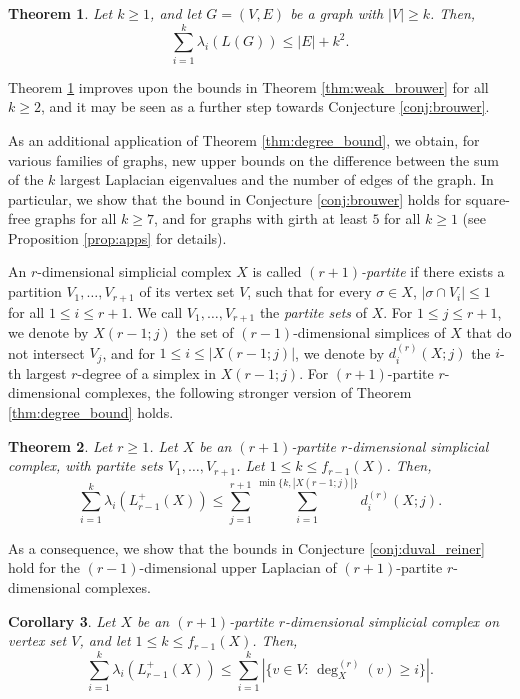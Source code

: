\documentclass[a4paper,11pt]{article}
\theoremstyle{plain}
\newtheorem{theorem}{\bf Theorem}
\newtheorem{corollary}[theorem]{\bf Corollary}
\theoremstyle{definition}
\numberwithin{theorem}{section}
\numberwithin{equation}{section}
\begin{document}
\begin{theorem}\label{thm:weak_brouwer_improved}
    Let $k\ge 1$, and let $G=(V,E)$ be a graph with $|V|\ge k$. Then,
    \[
        \sum_{i=1}^k \lambda_i(L(G))\le |E|+k^2.
    \]
\end{theorem}
Theorem \ref{thm:weak_brouwer_improved} improves upon the bounds in Theorem \ref{thm:weak_brouwer} for all $k\ge 2$, and it may be seen as a further step towards Conjecture \ref{conj:brouwer}.

As an additional application of Theorem \ref{thm:degree_bound}, we obtain, for various families of graphs, new upper bounds on the difference between the sum of the $k$ largest Laplacian eigenvalues and the number of edges of the graph. In particular, we show that the bound in Conjecture \ref{conj:brouwer} holds for square-free graphs for all $k\ge 7$, and for graphs with girth at least $5$ for all $k\ge 1$ (see Proposition \ref{prop:apps} for details). 

An $r$-dimensional simplicial complex $X$ is called \emph{$(r+1)$-partite} if there exists a partition $V_1,\ldots,V_{r+1}$ of its vertex set $V$, such that for every $\sigma\in X$, $|\sigma\cap V_i|\le 1$ for all $1\le i\le r+1$. We call $V_1,\ldots,V_{r+1}$ the \emph{partite sets} of $X$.  For $1\le j\le r+1$, we denote by $X(r-1;j)$ the set of $(r-1)$-dimensional simplices of $X$ that do not intersect $V_j$, and for $1\le i\le |X(r-1;j)|$, we denote by 
$d^{(r)}_i(X;j)$ the $i$-th largest $r$-degree of a simplex in $X(r-1;j)$. 
For $(r+1)$-partite $r$-dimensional complexes, the following stronger version of Theorem \ref{thm:degree_bound} holds.

\begin{theorem}\label{thm:degree_bound_partite}
    Let $r\ge 1$. Let $X$ be an $(r+1)$-partite $r$-dimensional simplicial complex, with partite sets $V_1,\ldots,V_{r+1}$.
    Let $1\le k\le f_{r-1}(X)$. Then,
    \[
        \sum_{i=1}^k \lambda_i(L^+_{r-1}(X))\le \sum_{j=1}^{r+1} \sum_{i=1}^{\min\{k,|X(r-1;j)|\}} d_{i}^{(r)}(X;j).
    \]
\end{theorem}

As a consequence, we show that the bounds in Conjecture \ref{conj:duval_reiner} hold for the $(r-1)$-dimensional upper Laplacian of $(r+1)$-partite $r$-dimensional complexes.

\begin{corollary}\label{cor:dr_partite}
      Let $X$ be an $(r+1)$-partite $r$-dimensional simplicial complex on vertex set $V$, and let $1\le k\le f_{r-1}(X)$. Then,
   \[
    \sum_{i=1}^{k} \lambda_i(L_{r-1}^{+}(X)) \le \sum_{i=1}^k \left| \{v\in V:\, \deg^{(r)}_X(v)\ge i\}\right|.
\]
\end{corollary}
\end{document}
